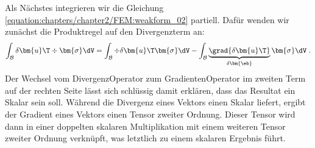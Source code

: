 \documentclass[letterpaper,10pt,german]{jupyterBook}
\begin{document}
\sphinxAtStartPar
Als Nächstes integrieren wir die Gleichung \eqref{equation:chapters/chapter2/FEM:weakform_02} partiell. Dafür wenden wir zunächst die Produktregel auf den Divergenzterm an:
\begin{equation}\label{equation:chapters/chapter2/FEM:divergenzsatz}
\begin{split}\int_{\mathcal{B}} \delta \bm{u}\T \div{\bm{\sigma}} \dV = \int_{\mathcal{B}} \div{\delta \bm{u}\T \bm{\sigma}} \dV -\int_{\mathcal{B}} \underbrace{\grad{\delta\bm{u}\T}}_{\delta \bm{\eb}}\bm{\sigma} \dV \; . \end{split}
\end{equation}
\sphinxAtStartPar
Der Wechsel vom Divergenz\sphinxhyphen{}Operator zum Gradienten\sphinxhyphen{}Operator im zweiten Term auf der rechten Seite lässt sich schlüssig damit erklären, dass das Resultat ein Skalar sein soll. Während die Divergenz eines Vektors einen Skalar liefert, ergibt der Gradient eines Vektors einen Tensor zweiter Ordnung. Dieser Tensor wird dann in einer doppelten skalaren Multiplikation mit einem weiteren Tensor zweiter Ordnung verknüpft, was letztlich zu einem skalaren Ergebnis führt.
\end{document}
